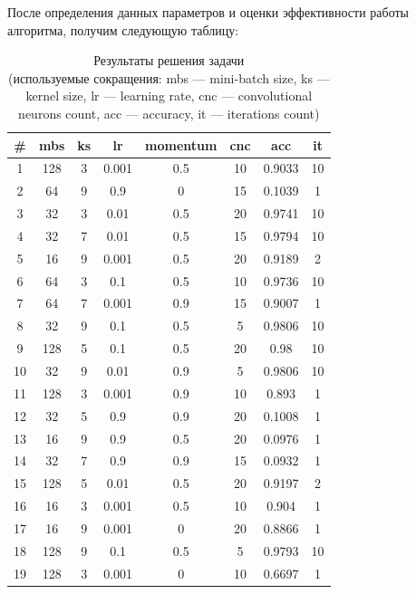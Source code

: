 \begin{textitemize}
После определения данных параметров и оценки эффективности работы алгоритма, получим следующую таблицу:

\begin{table}[ht]
	\caption{Результаты решения задачи \\(используемые сокращения: mbs --- mini-batch size, ks --- kernel size, lr --- learning rate, cnc --- convolutional neurons count, acc --- accuracy, it --- iterations count)}
	\centering
	\begin{tabular}{c c c c c c c c}
		\hline\hline
		\# & mbs & ks & lr    & momentum & cnc & acc    & it \\ [0.5ex] %
		\hline
		1        & 128 & 3  & 0.001 & 0.5      & 10  & 0.9033 & 10 \\
		2        & 64  & 9  & 0.9   & 0        & 15  & 0.1039 & 1  \\
		3        & 32  & 3  & 0.01  & 0.5      & 20  & 0.9741 & 10 \\
		4        & 32  & 7  & 0.01  & 0.5      & 15  & 0.9794 & 10 \\
		5        & 16  & 9  & 0.001 & 0.5      & 20  & 0.9189 & 2  \\
		6        & 64  & 3  & 0.1   & 0.5      & 10  & 0.9736 & 10 \\
		7        & 64  & 7  & 0.001 & 0.9      & 15  & 0.9007 & 1  \\
		8        & 32  & 9  & 0.1   & 0.5      & 5   & 0.9806 & 10 \\
		9        & 128 & 5  & 0.1   & 0.5      & 20  & 0.98   & 10 \\
		10       & 32  & 9  & 0.01  & 0.9      & 5   & 0.9806 & 10 \\
		11       & 128 & 3  & 0.001 & 0.9      & 10  & 0.893  & 1  \\
		12       & 32  & 5  & 0.9   & 0.9      & 20  & 0.1008 & 1  \\
		13       & 16  & 9  & 0.9   & 0.5      & 20  & 0.0976 & 1  \\
		14       & 32  & 7  & 0.9   & 0.9      & 15  & 0.0932 & 1  \\
		15       & 128 & 5  & 0.01  & 0.5      & 20  & 0.9197 & 2  \\
		16       & 16  & 3  & 0.001 & 0.5      & 10  & 0.904  & 1  \\
		17       & 16  & 9  & 0.001 & 0        & 20  & 0.8866 & 1  \\
		18       & 128 & 9  & 0.1   & 0.5      & 5   & 0.9793 & 10 \\
		19       & 128 & 3  & 0.001 & 0        & 10  & 0.6697 & 1  \\

\end{tabular}
\end{table}
\end{textitemize}
